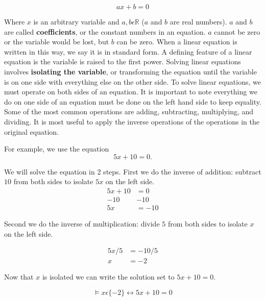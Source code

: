 \documentclass{book}
\theoremstyle{definition}
\begin{document}
\begin{equation}
\label{(4.1)}
ax+b=0
\end{equation}
                        
Where $x$ is an arbitrary variable and $a,b\epsilon \mathbb{R}$ ($a$ and $b$ are real numbers). $a$ and $b$ are called \textbf{coefficients}, or the constant numbers in an equation. $a$ cannot be zero or the variable would be lost, but $b$ can be zero. When a linear equation is written in this way, we say it is in standard form. A defining feature of a linear equation is the variable is raised to the first power. 
Solving linear equations involves \textbf{isolating the variable}, or transforming the equation until the variable is on one side with everything else on the other side. To solve linear equations, we must operate on both sides of an equation. It is important to note everything we do on one side of an equation must be done on the left hand side to keep equality. 
Some of the most common operations are adding, subtracting, multiplying, and dividing. It is most useful to apply the inverse operations of the operations in the original equation.

For example, we use the equation
\begin{equation}
\label{(4.2)}
5x+10=0.
\end{equation}

We will solve the equation in 2 steps. First we do the inverse of addition: subtract $10$ from both sides to isolate $5x$ on the left side.
\begin{equation}
\label{(4.3)}
\begin{split}
5x+10  &=  0 \\
  -10  &  -10 \\
5x     &= -10
\end{split}
\end{equation}

Second we do the inverse of multiplication: divide $5$ from both sides to isolate $x$ on the left side.

\begin{equation}
\label{(4.4)}
\begin{split}
5x/5  &=  -10/5 \\
  x   &=  -2
\end{split}
\end{equation}

Now that $x$ is isolated we can write the solution set to $5x+10=0$.

\begin{equation}
\label{(4.5)}
\models x\epsilon\{-2\}\leftrightarrow 5x+10=0
\end{equation}
\end{document}
